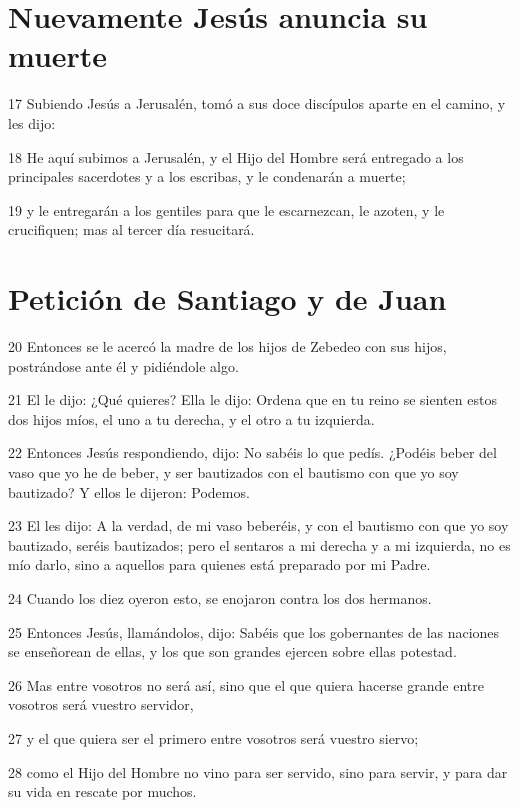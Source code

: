 \section*{Nuevamente Jesús anuncia su muerte}

\par 17 Subiendo Jesús a Jerusalén, tomó a sus doce discípulos aparte en el camino, y les dijo:
\par 18 He aquí subimos a Jerusalén, y el Hijo del Hombre será entregado a los principales sacerdotes y a los escribas, y le condenarán a muerte;
\par 19 y le entregarán a los gentiles para que le escarnezcan, le azoten, y le crucifiquen; mas al tercer día resucitará.

\section*{Petición de Santiago y de Juan}

\par 20 Entonces se le acercó la madre de los hijos de Zebedeo con sus hijos, postrándose ante él y pidiéndole algo.
\par 21 El le dijo: ¿Qué quieres? Ella le dijo: Ordena que en tu reino se sienten estos dos hijos míos, el uno a tu derecha, y el otro a tu izquierda.
\par 22 Entonces Jesús respondiendo, dijo: No sabéis lo que pedís. ¿Podéis beber del vaso que yo he de beber, y ser bautizados con el bautismo con que yo soy bautizado? Y ellos le dijeron: Podemos.
\par 23 El les dijo: A la verdad, de mi vaso beberéis, y con el bautismo con que yo soy bautizado, seréis bautizados; pero el sentaros a mi derecha y a mi izquierda, no es mío darlo, sino a aquellos para quienes está preparado por mi Padre.
\par 24 Cuando los diez oyeron esto, se enojaron contra los dos hermanos.
\par 25 Entonces Jesús, llamándolos, dijo: Sabéis que los gobernantes de las naciones se enseñorean de ellas, y los que son grandes ejercen sobre ellas potestad.
\par 26 Mas entre vosotros no será así, sino que el que quiera hacerse grande entre vosotros será vuestro servidor,
\par 27 y el que quiera ser el primero entre vosotros será vuestro siervo;
\par 28 como el Hijo del Hombre no vino para ser servido, sino para servir, y para dar su vida en rescate por muchos.

